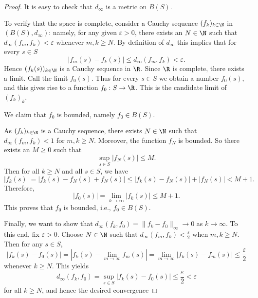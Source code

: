 \begin{proof}
It is easy to check that $d_\infty$ is a metric on $B(S)$. 

To verify that the space is
complete, consider a Cauchy sequence $(f_k)_{k \in \N}$
in $(B(S), d_\infty)$: namely, for any given $\varepsilon > 0$, there exists an $N \in \N$ such that $d_\infty(f_m,f_k) < \varepsilon$
whenever $m,k \ge N$. By definition of $d_\infty$ this implies that for every $s\in S$
\[
\left|f_m(s) - f_k(s)\right| \le d_\infty(f_m,f_k) < \varepsilon.
\]%
Hence $(f_k(s))_{k \in \N}$ is a Cauchy sequence in $\R$. 
\np
Since $\R$ is complete,
there exists a limit. Call the limit $f_0(s)$. Thus for every $s \in S$ we obtain
a number $f_0(s)$, and this gives rise to a function $f_0 : S \to \R$.
This is the candidate limit of $(f_k)_k$.

We claim that $f_0$ is bounded, namely $f_0\in B(S)$.

As $(f_k)_{k \in \N}$ is a Cauchy sequence, there exists $N\in \N$ such that
$d_\infty(f_m,f_k) < 1$ for $m,k \geq N$. Moreover, the function $f_N$ is bounded. So
there exists an $M \geq 0$ such that
\[
\sup_{s\in S} \left|f_N(s)\right| \le M.
\]%
Then for all $k \geq N$ and all $s \in S$, we have
\[
|f_k(s)| = |f_k(s) - f_N(s) + f_N(s)| \leq |f_k(s) - f_N(s)| + |f_N(s)| < M + 1.
\]%
Therefore,
\[
|f_0(s)| = \lim_{k \to \infty} |f_k(s)| \le M + 1.
\]%
This proves that $f_0$ is bounded, i.e., $f_0 \in B(S)$.

Finally, we want to show that $d_\infty(f_k,f_0) = \|f_k-f_0\|_{\infty} \to 0$ as $k \to \infty$.
To this end, fix $\varepsilon > 0$. Choose $N \in \N$ such that $d_\infty(f_m,f_k) < \frac{\varepsilon}{2}$
when $m,k \geq N$. Then for any $s \in S$,
\[
|f_k(s) - f_0(s)| = \left|f_k(s) - \lim_{m \to \infty} f_m(s)\right| = \lim_{m \to \infty} |f_k(s) - f_m(s)| \le \frac{\varepsilon}{2}
\]%
whenever $k \geq N$. This yields
\[
d_\infty(f_k,f_0) = \sup_{s \in S} \left|f_k(s) - f_0(s)\right| \le \frac{\varepsilon}{2} < \varepsilon
\]%
for all $k \geq N$, and hence the desired convergence
\end{proof}

